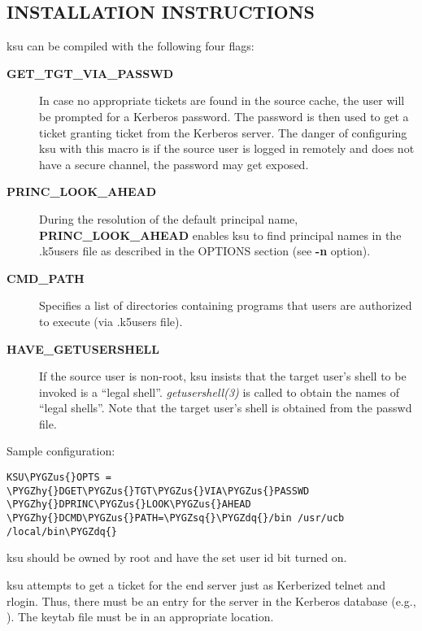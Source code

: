 \documentclass[letterpaper,10pt,english]{sphinxmanual}
\def\PYGZus{\char`\_}
\def\PYGZhy{\char`\-}
\def\PYGZsq{\char`\'}
\def\PYGZdq{\char`\"}
\begin{document}
\subsection{INSTALLATION INSTRUCTIONS}
\label{user/user_commands/ksu:installation-instructions}
ksu can be compiled with the following four flags:
\begin{description}
\item[{\textbf{GET\_TGT\_VIA\_PASSWD}}] \leavevmode
In case no appropriate tickets are found in the source cache, the
user will be prompted for a Kerberos password.  The password is
then used to get a ticket granting ticket from the Kerberos
server.  The danger of configuring ksu with this macro is if the
source user is logged in remotely and does not have a secure
channel, the password may get exposed.

\item[{\textbf{PRINC\_LOOK\_AHEAD}}] \leavevmode
During the resolution of the default principal name,
\textbf{PRINC\_LOOK\_AHEAD} enables ksu to find principal names in
the .k5users file as described in the OPTIONS section
(see \textbf{-n} option).

\item[{\textbf{CMD\_PATH}}] \leavevmode
Specifies a list of directories containing programs that users are
authorized to execute (via .k5users file).

\item[{\textbf{HAVE\_GETUSERSHELL}}] \leavevmode
If the source user is non-root, ksu insists that the target user's
shell to be invoked is a ``legal shell''.  \emph{getusershell(3)} is
called to obtain the names of ``legal shells''.  Note that the
target user's shell is obtained from the passwd file.

\end{description}

Sample configuration:

\begin{Verbatim}[commandchars=\\\{\}]
KSU\PYGZus{}OPTS = \PYGZhy{}DGET\PYGZus{}TGT\PYGZus{}VIA\PYGZus{}PASSWD \PYGZhy{}DPRINC\PYGZus{}LOOK\PYGZus{}AHEAD \PYGZhy{}DCMD\PYGZus{}PATH=\PYGZsq{}\PYGZdq{}/bin /usr/ucb /local/bin\PYGZdq{}
\end{Verbatim}

ksu should be owned by root and have the set user id bit turned on.

ksu attempts to get a ticket for the end server just as Kerberized
telnet and rlogin.  Thus, there must be an entry for the server in the
Kerberos database (e.g., ).  The keytab
file must be in an appropriate location.
\end{document}
